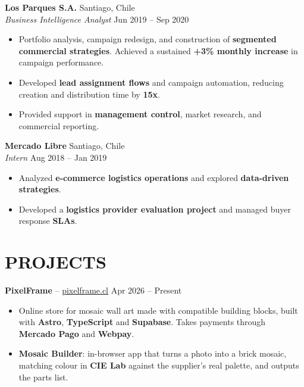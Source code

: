 \documentclass[a4paper,10.5pt]{extarticle}
\begin{document}
\vspace{4pt}

\textbf{Los Parques S.A.} \hfill Santiago, Chile\\
\textit{Business Intelligence Analyst} \hfill Jun 2019 -- Sep 2020
\begin{itemize}
    \item Portfolio analysis, campaign redesign, and construction of \textbf{segmented commercial strategies}. Achieved a sustained \textbf{+3\% monthly increase} in campaign performance.
    \item Developed \textbf{lead assignment flows} and campaign automation, reducing creation and distribution time by \textbf{15x}.
    \item Provided support in \textbf{management control}, market research, and commercial reporting.
\end{itemize}

\vspace{4pt}

\textbf{Mercado Libre} \hfill Santiago, Chile\\
\textit{Intern} \hfill Aug 2018 -- Jan 2019
\begin{itemize}
    \item Analyzed \textbf{e-commerce logistics operations} and explored \textbf{data-driven strategies}.
    \item Developed a \textbf{logistics provider evaluation project} and managed buyer response \textbf{SLAs}.
\end{itemize}

\section*{PROJECTS}

\textbf{PixelFrame} -- \href{https://pixelframe.cl}{pixelframe.cl} \hfill Apr 2026 -- Present
\begin{itemize}
    \item Online store for mosaic wall art made with compatible building blocks, built with \textbf{Astro}, \textbf{TypeScript} and \textbf{Supabase}. Takes payments through \textbf{Mercado Pago} and \textbf{Webpay}.
    \item \textbf{Mosaic Builder}: in-browser app that turns a photo into a brick mosaic, matching colour in \textbf{CIE Lab} against the supplier's real palette, and outputs the parts list.
\end{itemize}
\end{document}
